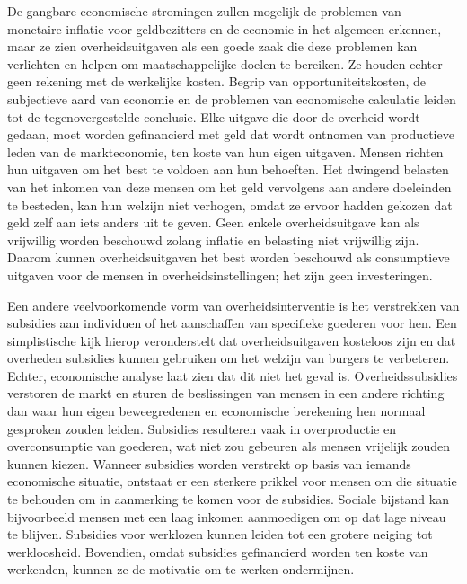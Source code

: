 De gangbare economische stromingen zullen mogelijk de problemen van monetaire inflatie voor geldbezitters en de economie in het algemeen erkennen, maar ze zien overheidsuitgaven als een goede zaak die deze problemen kan verlichten en helpen om maatschappelijke doelen te bereiken. Ze houden echter geen rekening met de werkelijke kosten. Begrip van opportuniteitskosten, de subjectieve aard van economie en de problemen van economische calculatie leiden tot de tegenovergestelde conclusie. Elke uitgave die door de overheid wordt gedaan, moet worden gefinancierd met geld dat wordt ontnomen van productieve leden van de markteconomie, ten koste van hun eigen uitgaven. Mensen richten hun uitgaven om het best te voldoen aan hun behoeften. Het dwingend belasten van het inkomen van deze mensen om het geld vervolgens aan andere doeleinden te besteden, kan hun welzijn niet verhogen, omdat ze ervoor hadden gekozen dat geld zelf aan iets anders uit te geven. Geen enkele overheidsuitgave kan als vrijwillig worden beschouwd zolang inflatie en belasting niet vrijwillig zijn. Daarom kunnen overheidsuitgaven het best worden beschouwd als consumptieve uitgaven voor de mensen in overheidsinstellingen; het zijn geen investeringen.

Een andere veelvoorkomende vorm van overheidsinterventie is het verstrekken van subsidies aan individuen of het aanschaffen van specifieke goederen voor hen. Een simplistische kijk hierop veronderstelt dat overheidsuitgaven kosteloos zijn en dat overheden subsidies kunnen gebruiken om het welzijn van burgers te verbeteren. Echter, economische analyse laat zien dat dit niet het geval is. Overheidssubsidies verstoren de markt en sturen de beslissingen van mensen in een andere richting dan waar hun eigen beweegredenen en economische berekening hen normaal gesproken zouden leiden. Subsidies resulteren vaak in overproductie en overconsumptie van goederen, wat niet zou gebeuren als mensen vrijelijk zouden kunnen kiezen. Wanneer subsidies worden verstrekt op basis van iemands economische situatie, ontstaat er een sterkere prikkel voor mensen om die situatie te behouden om in aanmerking te komen voor de subsidies. Sociale bijstand kan bijvoorbeeld mensen met een laag inkomen aanmoedigen om op dat lage niveau te blijven. Subsidies voor werklozen kunnen leiden tot een grotere neiging tot werkloosheid. Bovendien, omdat subsidies gefinancierd worden ten koste van werkenden, kunnen ze de motivatie om te werken ondermijnen.

